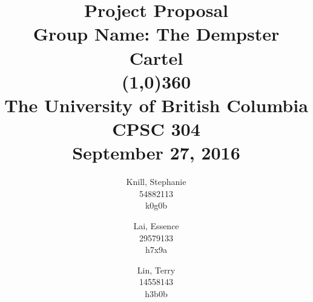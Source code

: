 \documentclass[11pt, oneside]{article}   	%
\theoremstyle{definition}
\theoremstyle{remark}
\begin{document}
\title{Project Proposal\\
\vspace{.4cm}
\large
Group Name: The Dempster Cartel \\
\line(1,0){360} \\               %
\vspace{1cm}
\large
The University of British Columbia \\
CPSC 304 \\
September 27, 2016
\vspace{1cm}}


\author{
Knill, Stephanie\\
54882113\\
k0g0b
\and
Lai, Essence\\
29579133 \\
h7x9a
\and
Lin, Terry\\
14558143 \\
h3b0b
}

\date{}                    %
\maketitle


\thispagestyle{empty}    %


\cleardoublepage
\tableofcontents
\end{document}
